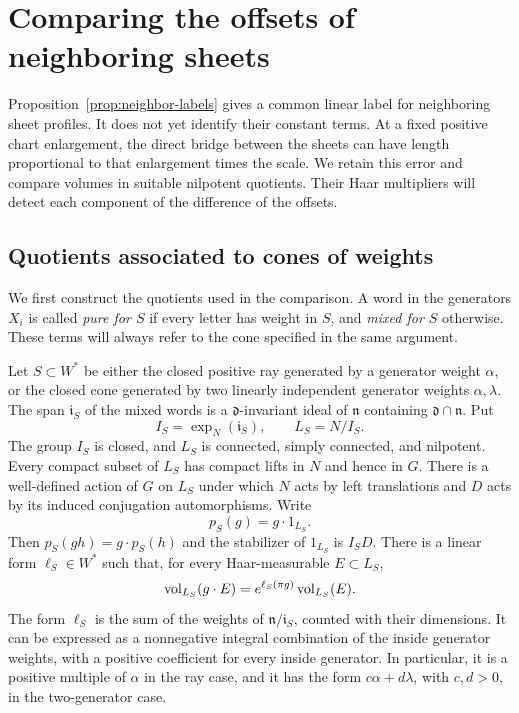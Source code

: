\section{Comparing the offsets of neighboring sheets}
\label{sec:neighbor-offsets}

Proposition~\ref{prop:neighbor-labels} gives a common linear label for
neighboring sheet profiles.  It does not yet identify their constant terms.
At a fixed positive chart enlargement, the direct bridge between the sheets
can have length proportional to that enlargement times the scale.  We retain
this error and compare volumes in suitable nilpotent quotients.  Their Haar
multipliers will detect each component of the difference of the offsets.

\subsection{Quotients associated to cones of weights}

We first construct the quotients used in the comparison.  A word in the
generators $X_i$ is called \emph{pure for $S$} if every letter has weight in
$S$, and \emph{mixed for $S$} otherwise.  These terms will always refer to the
cone specified in the same argument.

\begin{lemma}
\label{lem:cone-quotients}
Let $S\subset W^*$ be either the closed positive ray generated by a generator
weight $\alpha$, or the closed cone generated by two linearly independent
generator weights $\alpha,\lambda$.  The span $\mathfrak i_S$ of the mixed
words is a $\mathfrak d$-invariant ideal of $\mathfrak n$ containing
$\mathfrak d\cap\mathfrak n$.  Put
\[
 I_S=\exp_N(\mathfrak i_S),\qquad L_S=N/I_S.
\]
The group $I_S$ is closed, and $L_S$ is connected, simply connected, and
nilpotent.  Every compact subset of $L_S$ has compact lifts in $N$ and hence
in $G$.  There is a well-defined action of $G$ on $L_S$ under which $N$ acts
by left translations and $D$ acts by its induced conjugation automorphisms.  Write
\[
 p_S(g)=g\cdot 1_{L_S}.
\]
Then $p_S(gh)=g\cdot p_S(h)$ and the stabilizer of $1_{L_S}$ is $I_SD$.
There is a linear form $\ell_S\in W^*$ such that, for every Haar-measurable
$E\subset L_S$,
\begin{equation}
 \operatorname{vol}_{L_S}(g\cdot E)
   =e^{\ell_S(\pi g)}\operatorname{vol}_{L_S}(E).
 \label{eq:cone-haar-multiplier}
\end{equation}
The form $\ell_S$ is the sum of the weights of
$\mathfrak n/\mathfrak i_S$, counted with their dimensions.  It can be
expressed as a nonnegative integral combination of the inside generator
weights, with a positive coefficient for every inside generator.  In
particular, it is a positive multiple of $\alpha$ in the ray case, and it has
the form $c\alpha+d\lambda$, with $c,d>0$, in the two-generator case.
\end{lemma}

